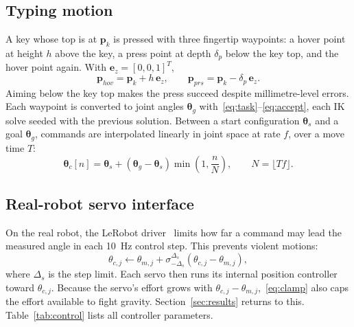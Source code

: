 \documentclass[conference]{IEEEtran}
\newcommand{\vect}[1]{\boldsymbol{#1}}
\begin{document}
\subsection{Typing motion}
A key whose top is at $\vect{p}_k$ is pressed with three fingertip waypoints: a hover point at height $h$ above the key, a press point at depth $\delta_p$ below the key top, and the hover point again. With $\vect{e}_z=[0,0,1]^T$,
\begin{equation}
\vect{p}_{hov} = \vect{p}_k + h\,\vect{e}_z, \qquad \vect{p}_{prs} = \vect{p}_k - \delta_p\,\vect{e}_z.
\label{eq:waypoints}
\end{equation}
Aiming below the key top makes the press succeed despite millimetre-level errors. Each waypoint is converted to joint angles $\boldsymbol{\theta}_g$ with~\eqref{eq:task}--\eqref{eq:accept}, each IK solve seeded with the previous solution. Between a start configuration $\boldsymbol{\theta}_s$ and a goal $\boldsymbol{\theta}_g$, commands are interpolated linearly in joint space at rate $f$, over a move time $T$:
\begin{equation}
\boldsymbol{\theta}_c[n] = \boldsymbol{\theta}_s + (\boldsymbol{\theta}_g-\boldsymbol{\theta}_s)\min\!\left(1,\frac{n}{N}\right), \qquad N=\lfloor Tf\rfloor.
\label{eq:interp}
\end{equation}

\subsection{Real-robot servo interface}
On the real robot, the LeRobot driver~\cite{lerobot} limits how far a command may lead the measured angle in each 10~Hz control step. This prevents violent motions:
\begin{equation}
\theta_{c,j} \leftarrow \theta_{m,j} + \sigma_{-\Delta_s}^{\Delta_s}\!\left(\theta_{c,j}-\theta_{m,j}\right),
\label{eq:clamp}
\end{equation}
where $\Delta_s$ is the step limit. Each servo then runs its internal position controller toward $\theta_{c,j}$. Because the servo's effort grows with $\theta_{c,j}-\theta_{m,j}$,~\eqref{eq:clamp} also caps the effort available to fight gravity. Section~\ref{sec:results} returns to this. Table~\ref{tab:control} lists all controller parameters.
\end{document}
